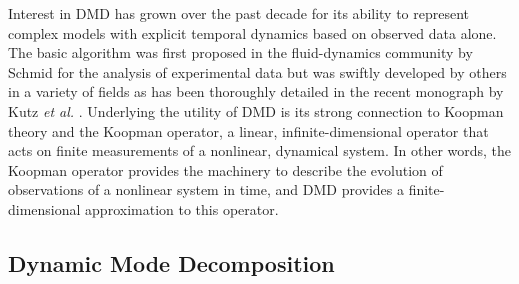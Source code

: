 \documentclass{anstrans}
\begin{document}
Interest in DMD has grown over the past decade for its ability to represent complex models with explicit temporal dynamics based on observed data alone.  
The basic algorithm was first proposed in the fluid-dynamics community by Schmid for the analysis of experimental data \cite{schmid2010dynamic} but was swiftly developed by others in a variety of fields as has been thoroughly detailed in the recent monograph by Kutz {\it et al.} \cite{kutz2016dynamic}.
Underlying the utility of DMD is its strong connection to Koopman theory and the Koopman operator, a linear, infinite-dimensional operator that acts on finite measurements of a nonlinear, dynamical system.
In other words, the Koopman operator provides the machinery to describe the evolution of observations of a nonlinear system in time, and DMD provides a finite-dimensional approximation to this operator.

\subsection{Dynamic Mode Decomposition} 
\end{document}
